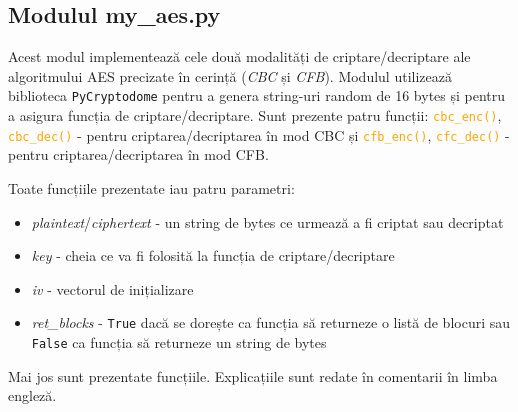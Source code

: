 \documentclass{article}
\begin{document}
\subsection{Modulul my\_aes.py}
Acest modul implementează cele două modalități de criptare/decriptare ale algoritmului AES precizate în cerință (\emph{CBC} și \emph{CFB}). Modulul utilizează biblioteca \lstinline{PyCryptodome}\cite{PyCryptodome} pentru a genera string-uri random de 16 bytes și pentru a asigura funcția de criptare/decriptare.
Sunt prezente patru funcții: \textcolor{orange}{\lstinline{cbc_enc()}}, \textcolor{orange}{\lstinline{cbc_dec()}} - pentru criptarea/decriptarea în mod CBC și \textcolor{orange}{\lstinline{cfb_enc()}}, \textcolor{orange}{\lstinline{cfc_dec()}} - pentru criptarea/decriptarea în mod CFB.\par
Toate funcțiile prezentate iau patru parametri:
\begin{itemize}
\item \emph{plaintext}/\emph{ciphertext} - un string de bytes ce urmează a fi criptat sau decriptat
\item \emph{key} - cheia ce va fi folosită la funcția de criptare/decriptare
\item \emph{iv} - vectorul de inițializare
\item \emph{ret\_blocks} - \lstinline{True} dacă se dorește ca funcția să returneze o listă de blocuri sau \lstinline{False} ca funcția să returneze un string de bytes
\end{itemize}
Mai jos sunt prezentate funcțiile. Explicațiile sunt redate în comentarii în limba engleză.\par
\newpage
\end{document}
